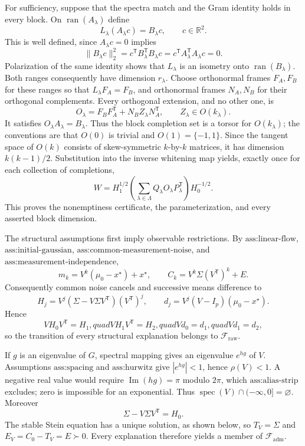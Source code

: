 For sufficiency, suppose that the spectra match and the Gram identity holds in every block.  On \(\operatorname{ran}(A_\lambda)\) define
\[
 L_\lambda(A_\lambda c)=B_\lambda c,
 \qquad c\in\mathbb R^2.
\]
This is well defined, since \(A_\lambda c=0\) implies
\[
 \lVert B_\lambda c\rVert_2^2
 =c^{\mathsf T}B_\lambda^{\mathsf T}B_\lambda c
 =c^{\mathsf T}A_\lambda^{\mathsf T}A_\lambda c=0.
\]
Polarization of the same identity shows that \(L_\lambda\) is an isometry onto \(\operatorname{ran}(B_\lambda)\).  Both ranges consequently have dimension \(r_\lambda\).  Choose orthonormal frames \(F_A,F_B\) for these ranges so that \(L_\lambda F_A=F_B\), and orthonormal frames \(N_A,N_B\) for their orthogonal complements.  Every orthogonal extension, and no other one, is
\[
 O_\lambda=F_BF_A^{\mathsf T}+N_BZ_\lambda N_A^{\mathsf T},
 \qquad Z_\lambda\in O(k_\lambda).
\]
It satisfies \(O_\lambda A_\lambda=B_\lambda\).  Thus the block completion set is a torsor for \(O(k_\lambda)\); the conventions are that \(O(0)\) is trivial and \(O(1)=\{-1,1\}\).  Since the tangent space of \(O(k)\) consists of skew-symmetric \(k\)-by-\(k\) matrices, it has dimension \(k(k-1)/2\).  Substitution into the inverse whitening map yields, exactly once for each collection of completions,
\[
 W=H_1^{1/2}\left(\sum_{\lambda\in\Lambda}
 Q_\lambda O_\lambda P_\lambda^{\mathsf T}\right)H_0^{-1/2}.
\]
This proves the nonemptiness certificate, the parameterization, and every asserted block dimension.

The structural assumptions first imply observable restrictions.  By \(\text{ass:linear-flow}\), \(\text{ass:initial-gaussian}\), \(\text{ass:common-measurement-noise}\), and \(\text{ass:measurement-independence}\),
\[
 m_k=V^k(\mu_0-x^\star)+x^\star,
 \qquad C_k=V^k\Sigma(V^{\mathsf T})^k+E.
\]
Consequently common noise cancels and successive means difference to
\[
 H_j=V^j(\Sigma-V\Sigma V^{\mathsf T})(V^{\mathsf T})^j,
 \qquad d_j=V^j(V-I_p)(\mu_0-x^\star).
\]
Hence
\[
 VH_0V^{\mathsf T}=H_1,quad VH_1V^{\mathsf T}=H_2,quad
 Vd_0=d_1,quad Vd_1=d_2,
\]
so the transition of every structural explanation belongs to \(\mathcal F_{\mathrm{raw}}\).

If \(g\) is an eigenvalue of \(G\), spectral mapping gives an eigenvalue \(e^{hg}\) of \(V\).  Assumptions \(\text{ass:spacing}\) and \(\text{ass:hurwitz}\) give \(|e^{hg}|<1\), hence \(\rho(V)<1\).  A negative real value would require \(\operatorname{Im}(hg)=\pi\) modulo \(2\pi\), which \(\text{ass:alias-strip}\) excludes; zero is impossible for an exponential.  Thus \(\operatorname{spec}(V)\cap(-\infty,0]=\varnothing\).  Moreover
\[
 \Sigma-V\Sigma V^{\mathsf T}=H_0.
\]
The stable Stein equation has a unique solution, as shown below, so \(T_V=\Sigma\) and \(E_V=C_0-T_V=E\succ0\).  Every explanation therefore yields a member of \(\mathcal F_{\mathrm{adm}}\).

